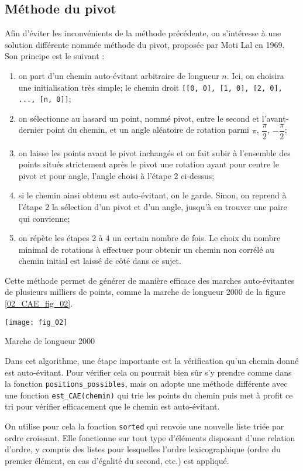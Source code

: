 \subsection*{Méthode du pivot}
Afin d’éviter les inconvénients de la méthode précédente, on s’intéresse à une solution différente nommée
méthode du pivot, proposée par Moti Lal en 1969. Son principe est le suivant :
\begin{enumerate}
\item on part d’un chemin auto-évitant arbitraire de longueur $n$. Ici, on choisira une initialisation très simple;
le chemin droit \lstinline{[[0, 0], [1, 0], [2, 0], ..., [n, 0]]};
\item on sélectionne au hasard un point, nommé pivot, entre le second et l’avant-dernier point du chemin,
et un angle aléatoire de rotation parmi $\pi$, $\dfrac{\pi}{2}$, $-\dfrac{\pi}{2}$;
\item on laisse les points avant le pivot inchangés et on fait subir à l’ensemble des points situés strictement
après le pivot une rotation ayant pour centre le pivot et pour angle, l’angle choisi à l’étape 2 ci-dessus;
\item si le chemin ainsi obtenu est auto-évitant, on le garde. Sinon, on reprend à l’étape 2 la sélection d’un
pivot et d’un angle, jusqu’à en trouver une paire qui convienne;
\item on répète les étapes 2 à 4 un certain nombre de fois. Le choix du nombre minimal de rotations à
effectuer pour obtenir un chemin non corrélé au chemin initial est laissé de côté dans ce sujet.
\end{enumerate}
Cette méthode permet de générer de manière efficace des marches auto-évitantes de plusieurs milliers de
points, comme la marche de longueur 2000 de la figure \ref{02_CAE_fig_02}.

\begin{marginfigure}
\texttt{[image: fig\_02]}
\caption{Marche de longueur 2000\label{02_CAE_fig_02}}
\end{marginfigure}

Dans cet algorithme, une étape importante est la vérification qu’un chemin donné est auto-évitant. Pour
vérifier cela on pourrait bien sûr s’y prendre comme dans la fonction \lstinline{positions_possibles}, mais on adopte une méthode différente avec une fonction \lstinline{est_CAE(chemin)} qui trie les points du chemin puis met à profit ce tri pour vérifier efficacement que le chemin est auto-évitant.

On utilise pour cela la fonction \lstinline{sorted} qui renvoie une nouvelle liste triée par ordre croissant. Elle fonctionne
sur tout type d’éléments disposant d’une relation d’ordre, y compris des listes pour lesquelles l’ordre lexicographique (ordre du premier élément, en cas d’égalité du second, etc.) est appliqué. %

